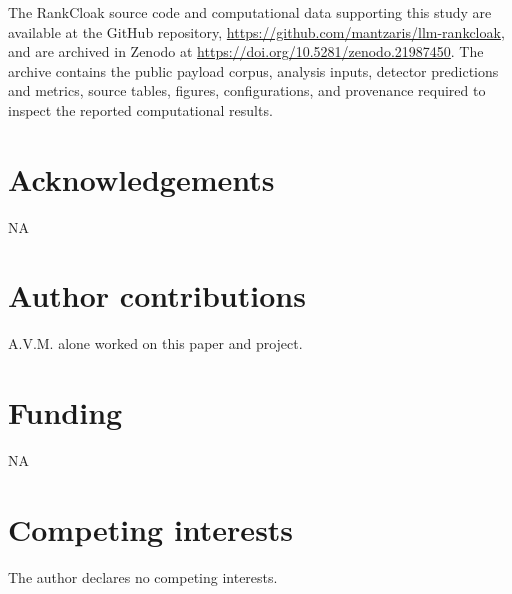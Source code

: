\documentclass[fleqn,10pt]{wlscirep}
\begin{document}
The RankCloak source code and computational data supporting this study are available at the GitHub repository, \url{https://github.com/mantzaris/llm-rankcloak}, and are archived in Zenodo at \url{https://doi.org/10.5281/zenodo.21987450}. The archive contains the public payload corpus, analysis inputs, detector predictions and metrics, source tables, figures, configurations, and provenance required to inspect the reported computational results.



\section*{Acknowledgements}

NA

\section*{Author contributions}

A.V.M. alone worked on this paper and project.

\section*{Funding}

NA

\section*{Competing interests}

The author declares no competing interests.
\end{document}
